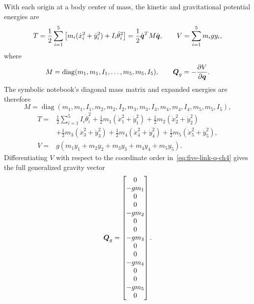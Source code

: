 \documentclass[../main.tex]{subfiles}
\begin{document}
	With each origin at a body center of mass, the kinetic and gravitational potential energies are
	\begin{equation}
	T=\frac12\sum_{i=1}^{5}\left[m_i(\dot x_i^2+\dot y_i^2)+I_i\dot\theta_i^2\right]
	=\frac12\dot{\boldsymbol{q}}^{T}M\dot{\boldsymbol{q}},
	\qquad
	V=\sum_{i=1}^{5}m_igy_i,
	\label{eq:five-link-energies-ch4}
	\end{equation}
	where
	\begin{equation}
	M=\operatorname{diag}(m_1,m_1,I_1,\ldots,m_5,m_5,I_5),
	\qquad
	\boldsymbol{Q}_g=-\frac{\partial V}{\partial\boldsymbol{q}}.
	\label{eq:five-link-mass-gravity-ch4}
	\end{equation}
	The symbolic notebook's diagonal mass matrix and expanded energies are therefore
	\begin{equation}
	M=\operatorname{diag}(m_1,m_1,I_1,m_2,m_2,I_2,m_3,m_3,I_3,m_4,m_4,I_4,m_5,m_5,I_5),
	\label{eq:five-link-expanded-mass-ch4}
	\end{equation}
	\begin{equation}
	\begin{aligned}
	T={}&\frac12\sum_{i=1}^{5}I_i\dot\theta_i^2
	+\frac12m_1(\dot x_1^2+\dot y_1^2)+\frac12m_2(\dot x_2^2+\dot y_2^2)\\
	&+\frac12m_3(\dot x_3^2+\dot y_3^2)+\frac12m_4(\dot x_4^2+\dot y_4^2)
	+\frac12m_5(\dot x_5^2+\dot y_5^2),\\
	V={}&g(m_1y_1+m_2y_2+m_3y_3+m_4y_4+m_5y_5).
	\end{aligned}
	\label{eq:five-link-expanded-energies-ch4}
	\end{equation}
	Differentiating $V$ with respect to the coordinate order in~\eqref{eq:five-link-q-ch4} gives the full generalized gravity vector
	\begin{equation}
	\boldsymbol{Q}_g=\begin{bmatrix}
	0\\-gm_1\\0\\0\\-gm_2\\0\\0\\-gm_3\\0\\0\\-gm_4\\0\\0\\-gm_5\\0
	\end{bmatrix}.
	\label{eq:five-link-expanded-gravity-ch4}
	\end{equation}
\end{document}
